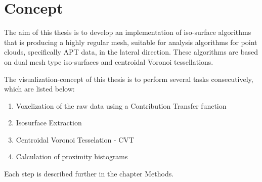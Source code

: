 \chapter{Concept}
\label{concept}

The aim of this thesis is to develop an implementation of iso-surface algorithms that is producing a highly regular mesh, suitable for analysis algorithms for point clouds, specifically APT data, in the lateral direction. These algorithms are based on dual mesh type iso-surfaces and centroidal Voronoi tessellations.

The visualization-concept of this thesis is to perform several tasks consecutively, which are listed below:

\begin{enumerate}

	\item Voxelization of the raw data using a Contribution Transfer function
	\item Isosurface Extraction
	\item Centroidal Voronoi Tesselation - CVT
	\item Calculation of proximity histograms
	
\end{enumerate}

Each step is described further in the chapter Methods.
